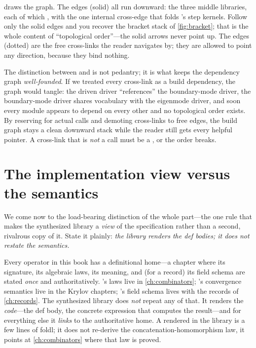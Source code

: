  draws the graph. The  edges (solid) all run
downward:   the three middle libraries, each of which
 , with the one internal cross-edge that
 folds 's step kernels. Follow only the solid
edges and you recover the bracket stack of \cref{fig:bracket}; that is the whole
content of ``topological order''---the solid arrows never point up. The
 edges (dotted) are the free cross-links the reader navigates by;
they are allowed to point any direction, because they bind nothing.

\begin{pitfall}
The distinction between  and  is not pedantry; it
is what keeps the dependency graph \emph{well-founded}. If we treated every
cross-link as a build dependency, the graph would tangle: the driven driver
``references'' the boundary-mode driver, the boundary-mode driver shares vocabulary
with the eigenmode driver, and soon every module appears to depend on every other
and no topological order exists. By reserving  for actual calls and
demoting cross-links to free  edges, the build graph stays a clean
downward stack while the reader still gets every helpful pointer. A cross-link that
is \emph{not} a call must be a , or the order breaks.
\end{pitfall}

\section{The implementation view versus the semantics}
\label{sec:viewvssem}

We come now to the load-bearing distinction of the whole part---the one rule that
makes the synthesized library a \emph{view} of the specification rather than a
second, rivalrous copy of it. State it plainly: \emph{the library renders the def
bodies; it does not restate the semantics.}

Every operator in this book has a definitional home---a chapter where its
signature, its algebraic laws, its meaning, and (for a record) its field schema are
stated \emph{once} and authoritatively. 's laws live in
\cref{ch:combinators}; 's convergence semantics live in the Krylov
chapters; 's field schema lives with the records of
\cref{ch:records}. The synthesized library does \emph{not} repeat any of that. It
renders the \emph{code}---the def body, the concrete expression that computes the
result---and for everything else it \emph{links} to the authoritative home. A
rendered  in the library is a few lines of foldl; it does
not re-derive the concatenation-homomorphism law, it points at \cref{ch:combinators}
where that law is proved.

